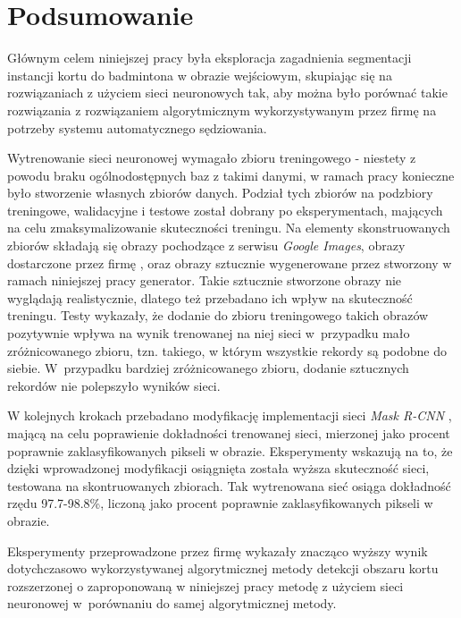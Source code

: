\chapter{Podsumowanie}

Głównym celem niniejszej pracy była eksploracja zagadnienia segmentacji instancji kortu do badmintona w obrazie wejściowym, skupiając się na rozwiązaniach z użyciem sieci neuronowych tak, aby można było porównać takie rozwiązania z rozwiązaniem algorytmicznym wykorzystywanym przez firmę \blue{} na potrzeby systemu automatycznego sędziowania.

Wytrenowanie sieci neuronowej wymagało zbioru treningowego - niestety z powodu braku ogólnodostępnych baz z takimi danymi, w ramach pracy konieczne było stworzenie własnych zbiorów danych. Podział tych zbiorów na podzbiory treningowe, walidacyjne i testowe został dobrany po eksperymentach, mających na celu zmaksymalizowanie skuteczności treningu. Na elementy skonstruowanych zbiorów składają się obrazy pochodzące z serwisu \textit{Google Images}, obrazy dostarczone przez firmę \blue{}, oraz obrazy sztucznie wygenerowane przez stworzony w ramach niniejszej pracy generator. Takie sztucznie stworzone obrazy nie wyglądają realistycznie, dlatego też przebadano ich wpływ na skuteczność treningu. Testy wykazały, że dodanie do zbioru treningowego takich obrazów pozytywnie wpływa na wynik trenowanej na niej sieci w~przypadku mało zróżnicowanego zbioru, tzn. takiego, w którym wszystkie rekordy są podobne do siebie. W~przypadku bardziej zróżnicowanego zbioru, dodanie sztucznych rekordów nie polepszyło wyników sieci.

W kolejnych krokach przebadano modyfikację implementacji sieci \textit{Mask R-CNN} \cite{matterport-mask-rcnn}, mającą na celu poprawienie dokładności trenowanej sieci, mierzonej jako procent poprawnie zaklasyfikowanych pikseli w obrazie. Eksperymenty wskazują na to, że dzięki wprowadzonej modyfikacji osiągnięta została wyższa skuteczność sieci, testowana na skontruowanych zbiorach. Tak wytrenowana sieć osiąga dokładność rzędu 97.7-98.8\%, liczoną jako procent poprawnie zaklasyfikowanych pikseli w obrazie. 

Eksperymenty przeprowadzone przez firmę \blue{} wykazały znacząco wyższy wynik dotychczasowo wykorzystywanej algorytmicznej metody detekcji obszaru kortu rozszerzonej o zaproponowaną w niniejszej pracy metodę z użyciem sieci neuronowej w~porównaniu do samej algorytmicznej metody.


